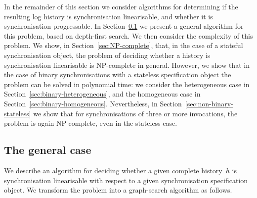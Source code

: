 In the remainder of this section we consider algorithms for determining if the
resulting log history is synchronisation linearisable, and whether it is
synchronisation progressable.  In Section~\ref{sec:algorithm-dfs} we present a
general algorithm for this problem, based on depth-first search.  We then
consider the complexity of this problem.  We show, in
Section~\ref{sec:NP-complete}, that, in the case of a stateful synchronisation
object, the problem of deciding whether a history is synchronisation
linearisable is NP-complete in general.  However, we show that in the case of
binary synchronisations with a stateless specification object the problem can
be solved in polynomial time: we consider the heterogeneous case in
Section~\ref{sec:binary-heterogeneous}, and the homogeneous case in
Section~\ref{sec:binary-homogeneous}.  Nevertheless, in
Section~\ref{sec:non-binary-stateless} we show that for synchronisations of
three or more invocations, the problem is again NP-complete, even in the
stateless case.





\subsection{The general case}
\label{sec:algorithm-dfs}

We describe an algorithm for deciding whether a given complete history~$h$ is
synchronisation linearisable with respect to a given synchronisation
specification object.  We transform the problem into a graph-search algorithm
as follows.


